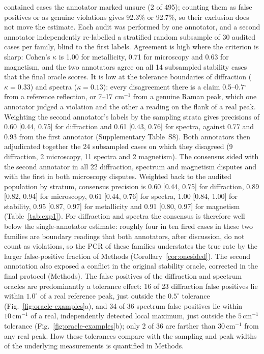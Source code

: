 \documentclass[pdflatex,sn-nature]{sn-jnl}
\begin{document}
{contained cases the annotator marked unsure (2 of 495); counting them as false positives or as
genuine violations gives 92.3\% or 92.7\%, so their exclusion does not move the estimate. Each
audit was performed by one annotator, and a second annotator independently re-labelled a stratified
random subsample of 30 audited cases per family, blind to the first labels. Agreement is high where the
criterion is sharp: Cohen's $\kappa$ is 1.00 for metallicity, 0.71 for microscopy and 0.63 for
magnetism, and the two annotators agree on all 14 subsampled stability cases that the final oracle
scores. It is low at the tolerance boundaries of diffraction ($\kappa=0.33$) and spectra ($\kappa=0.13$):
every disagreement there is a claim 0.5--0.7$^\circ$ from a reference reflection, or 7--17
$\mathrm{cm}^{-1}$ from a genuine Raman peak, which one annotator judged a violation and the other a
reading on the flank of a real peak. Weighting the second annotator's labels by the sampling strata
gives precisions of 0.60 [0.44, 0.75] for diffraction and 0.61 [0.43, 0.76] for spectra, against 0.77 and
0.93 from the first annotator (Supplementary Table~S8). Both annotators then adjudicated together the
24 subsampled cases on which they disagreed (9 diffraction, 2 microscopy, 11 spectra and 2 magnetism).
The consensus sided with the second annotator in all 22 diffraction, spectrum and magnetism disputes and
with the first in both microscopy disputes. Weighted back to the audited population by stratum, consensus
precision is 0.60 [0.44, 0.75] for diffraction, 0.89 [0.82, 0.94] for microscopy, 0.61 [0.44, 0.76] for
spectra, 1.00 [0.84, 1.00] for stability, 0.95 [0.87, 0.97] for metallicity and 0.91 [0.80, 0.97] for
magnetism (Table~\ref{tab:exp1}). For diffraction and spectra the consensus is therefore well below the
single-annotator estimate: roughly four in ten fired cases in these two families are boundary readings that
both annotators, after discussion, do not count as violations, so the PCR of these families understates the
true rate by the larger false-positive fraction of Methods (Corollary~\ref{cor:onesided}). The second annotation also exposed a conflict in
the original stability oracle, corrected in the final protocol (Methods). The false positives of the diffraction and spectrum oracles
are predominantly a tolerance effect: 16 of 23 diffraction false positives lie within
$1.0^\circ$ of a real reference peak, just outside the $0.5^\circ$ tolerance
(Fig.~\ref{fig:oracle-examples}a), and 34 of 36 spectrum false positives lie within
$10\,\mathrm{cm}^{-1}$ of a real, independently detected local maximum, just outside the
$5\,\mathrm{cm}^{-1}$ tolerance (Fig.~\ref{fig:oracle-examples}b); only 2 of 36 are farther than
$30\,\mathrm{cm}^{-1}$ from any real peak. How these tolerances compare with the sampling and
peak widths of the underlying measurements is quantified in Methods.}
\end{document}
